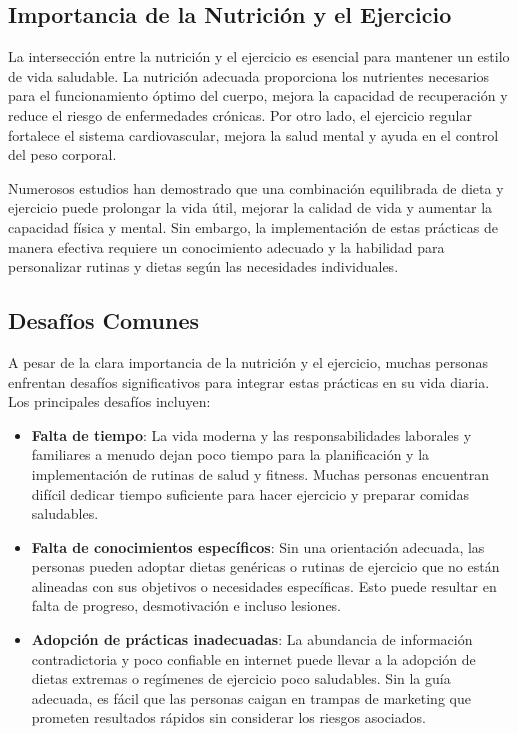 \begin{description}
  \subsection{Importancia de la Nutrición y el Ejercicio}
  \item La intersección entre la nutrición y el ejercicio es esencial para mantener un estilo de vida saludable. La nutrición adecuada proporciona los nutrientes necesarios para el funcionamiento óptimo del cuerpo, mejora la capacidad de recuperación y reduce el riesgo de enfermedades crónicas. Por otro lado, el ejercicio regular fortalece el sistema cardiovascular, mejora la salud mental y ayuda en el control del peso corporal.
  \item Numerosos estudios han demostrado que una combinación equilibrada de dieta y ejercicio puede prolongar la vida útil, mejorar la calidad de vida y aumentar la capacidad física y mental. Sin embargo, la implementación de estas prácticas de manera efectiva requiere un conocimiento adecuado y la habilidad para personalizar rutinas y dietas según las necesidades individuales.
  \subsection{Desafíos Comunes}
  A pesar de la clara importancia de la nutrición y el ejercicio, muchas personas enfrentan desafíos significativos para integrar estas prácticas en su vida diaria. Los principales desafíos incluyen:
  \begin{itemize}
    \item \textbf{Falta de tiempo}: La vida moderna y las responsabilidades laborales y familiares a menudo dejan poco tiempo para la planificación y la implementación de rutinas de salud y fitness. Muchas personas encuentran difícil dedicar tiempo suficiente para hacer ejercicio y preparar comidas saludables.
    \item \textbf{Falta de conocimientos específicos}: Sin una orientación adecuada, las personas pueden adoptar dietas genéricas o rutinas de ejercicio que no están alineadas con sus objetivos o necesidades específicas. Esto puede resultar en falta de progreso, desmotivación e incluso lesiones.
    \item \textbf{Adopción de prácticas inadecuadas}: La abundancia de información contradictoria y poco confiable en internet puede llevar a la adopción de dietas extremas o regímenes de ejercicio poco saludables. Sin la guía adecuada, es fácil que las personas caigan en trampas de marketing que prometen resultados rápidos sin considerar los riesgos asociados.
  \end{itemize}

\end{description}
